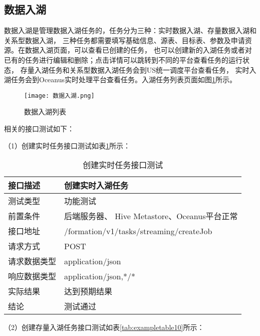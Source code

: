\subsection{数据入湖}

数据入湖是管理数据入湖任务的，任务分为三种：实时数据入湖、存量数据入湖和关系型数据入湖，
三种任务都需要填写基础信息、源表、目标表、参数及申请资源。在数据入湖页面，可以查看已创建的任务，
也可以创建新的入湖任务或者对已有的任务进行编辑和删除；点击详情可以跳转到不同的平台查看任务的运行状态，
存量入湖任务和关系型数据入湖任务会到US统一调度平台查看任务，
实时入湖任务会到Oceanus实时处理平台查看任务。入湖任务列表页面如图\ref{fig:数据入湖}所示。

\begin{figure}[H]
  \centering
  \texttt{[image: 数据入湖.png]}
  \caption{数据入湖列表}
  \label{fig:数据入湖}
\end{figure}

相关的接口测试如下：

（1）创建实时任务接口测试如表\ref{tab:exampletable9}所示：

\begin{table}[H]
  \centering
  \caption{创建实时任务接口测试}
  \label{tab:exampletable9}
  \begin{tabular}{ll}
    \toprule
    接口描述         & 创建实时入湖任务         \\
    \midrule
    测试类型         & 功能测试         \\
    前置条件         & 后端服务器、 Hive Metastore、Oceanus平台正常         \\
    接口地址          & /formation/v1/tasks/streaming/createJob        \\
    请求方式         & POST      \\
    请求数据类型         & application/json     \\
    响应数据类型         & application/json,*/*           \\
    实际结果         & 达到预期结果           \\
    结论            & 测试通过           \\
    \bottomrule
  \end{tabular}
\end{table}

（2）创建存量入湖任务接口测试如表\ref{tab:exampletable10}所示：

